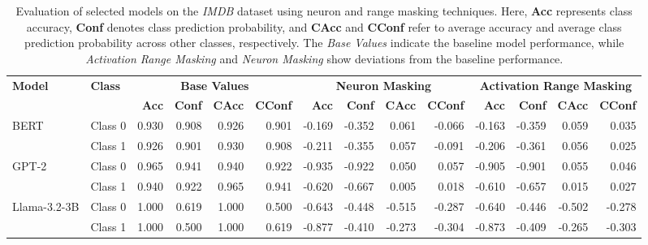 \begin{table*}[t]
\caption{Evaluation of selected models on the \textit{IMDB} dataset using neuron and range masking techniques. Here, \textbf{Acc} represents class accuracy, \textbf{Conf} denotes class prediction probability, and \textbf{CAcc} and \textbf{CConf} refer to average accuracy and average class prediction probability across other classes, respectively. The \textit{Base Values} indicate the baseline model performance, while \textit{Activation Range Masking} and \textit{Neuron Masking} show deviations from the baseline performance.}
\centering
\scriptsize
\begin{tabular}{l|l|rrrr|rrrr|rrrr}
\toprule
\textbf{Model} & \textbf{Class} & \multicolumn{4}{c|}{\textbf{Base Values}} & \multicolumn{4}{c|}{\textbf{Neuron Masking}} & \multicolumn{4}{c}{\textbf{Activation Range Masking}} \\
\cmidrule(r){2-5} \cmidrule(r){6-9} \cmidrule{10-14}
&  & \textbf{Acc} & \textbf{Conf} & \textbf{CAcc} & \textbf{CConf} & \textbf{Acc} & \textbf{Conf} & \textbf{CAcc} & \textbf{CConf} & \textbf{Acc} & \textbf{Conf} & \textbf{CAcc} & \textbf{CConf} \\
\midrule
\multirow{2}{*}{BERT} 
&Class 0 & 0.930 & 0.908 & 0.926 & 0.901 & -0.169 & -0.352 & 0.061 & -0.066 & -0.163 & -0.359 & 0.059 & 0.035 \\
&Class 1 & 0.926 & 0.901 & 0.930 & 0.908 & -0.211 & -0.355 & 0.057 & -0.091 & -0.206 & -0.361 & 0.056 & 0.025 \\
\midrule
\multirow{2}{*}{GPT-2} 
&Class 0 & 0.965 & 0.941 & 0.940 & 0.922 & -0.935 & -0.922 & 0.050 & 0.057 & -0.905 & -0.901 & 0.055 & 0.046 \\
&Class 1 & 0.940 & 0.922 & 0.965 & 0.941 & -0.620 & -0.667 & 0.005 & 0.018 & -0.610 & -0.657 & 0.015 & 0.027 \\
\midrule
\multirow{2}{*}{Llama-3.2-3B} 
&Class 0 & 1.000 & 0.619 & 1.000 & 0.500 & -0.643 & -0.448 & -0.515 & -0.287 & -0.640 & -0.446 & -0.502 & -0.278 \\
&Class 1 & 1.000 & 0.500 & 1.000 & 0.619 & -0.877 & -0.410 & -0.273 & -0.304 & -0.873 & -0.409 & -0.265 & -0.303 \\

\bottomrule
\end{tabular}

\label{tab:imdb_on_all}
\end{table*}

